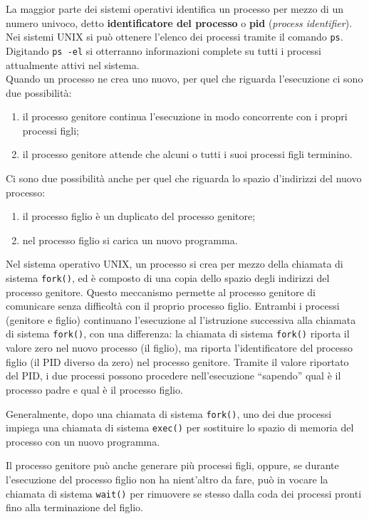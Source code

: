 \documentclass[11pt,a4paper]{article}
\begin{document}
La maggior parte dei sistemi operativi identi­fica un processo per mezzo di un numero univoco, detto \textbf{identificatore del processo} o \textbf{pid} (\emph{process identifier}).
Nei sistemi UNIX si può ottenere l'elenco dei processi tramite il comando \texttt{ps}. Digitan­do \texttt{ps -el} si otterranno informazioni complete su tutti i processi attualmente attivi nel si­stema.
\medskip\\
Quando un processo ne crea uno nuovo, per quel che riguarda l'esecuzione ci sono
due possibilità:
\begin{enumerate}
  \item il processo genitore continua l'esecuzione in modo concorrente con i propri processi
  figli;
  \item il processo genitore attende che alcuni o tutti i suoi processi figli terminino.
\end{enumerate}
Ci sono due possibilità anche per quel che riguarda lo spazio d'indirizzi del nuovo processo:
\begin{enumerate}
  \item il processo figlio è un duplicato del processo genitore;
  \item nel processo figlio si carica un nuovo programma.
\end{enumerate}
%
Nel sistema operativo UNIX, un processo si crea per mezzo della chiamata di
sistema \texttt{fork()}, ed è composto di una copia dello spazio degli indirizzi del processo geni­tore. Questo meccanismo permette al processo genitore di comunicare senza difficoltà con
il proprio processo figlio. Entrambi i processi (genitore e figlio) continuano l'esecuzione al­
l'istruzione successiva alla chiamata di sistema \texttt{fork()}, con una differenza: la chiamata di
sistema \texttt{fork()} riporta il valore zero nel nuovo processo (il figlio), ma riporta l'identifica­tore del processo figlio (il PID diverso da zero) nel processo genitore. Tramite il valore ripor­tato del PID, i due processi possono procedere nell'esecuzione “sapendo” qual è il processo
padre e qual è il processo figlio.

Generalmente, dopo una chiamata di sistema \texttt{fork()}, uno dei due processi impiega
una chiamata di sistema \texttt{exec()} per sostituire lo spazio di memoria del processo con un
nuovo programma.

Il processo genitore può anche generare più processi
figli, oppure, se durante l'esecuzione del processo figlio non ha nient'altro da fare, può in­
vocare la chiamata di sistema \texttt{wait()} per rimuovere se stesso dalla coda dei processi pronti
fino alla terminazione del figlio.
\end{document}
